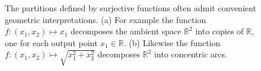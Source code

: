 \documentclass[
  letterpaper,
  DIV=11,
  numbers=noendperiod]{scrartcl}
\begin{document}
\begin{figure}

\begin{minipage}{0.50\linewidth}


\subcaption{\label{fig-partition-example-product}}

\end{minipage}%
%
\begin{minipage}{0.50\linewidth}


\subcaption{\label{fig-partition-example-radial}}

\end{minipage}%

\caption{\label{fig-partition-examples}The partitions defined by
surjective functions often admit convenient geometric interpretations.
(a) For example the function \(f : (x_{1}, x_{2}) \mapsto x_{1}\)
decomposes the ambient space \(\mathbb{R}^{2}\) into copies of
\(\mathbb{R}\), one for each output point \(x_{1} \in \mathbb{R}\). (b)
Likewise the function
\(f: (x_{1}, x_{2}) \mapsto \sqrt{x_{1}^{2} + x_{2}^{2} }\) decomposes
\(\mathbb{R}^{2}\) into concentric arcs.}

\end{figure}%
\end{document}
